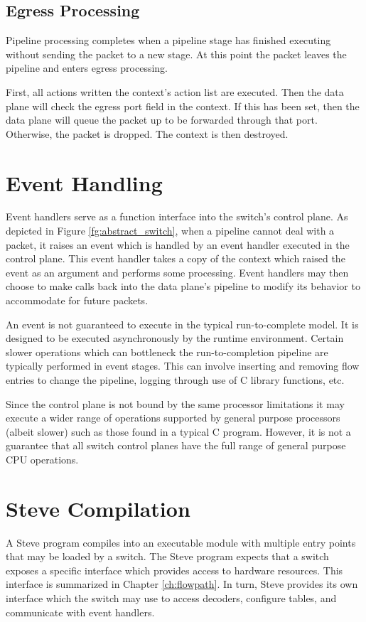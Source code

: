 \subsection{Egress Processing} \label{egress_desc}

Pipeline processing completes when a pipeline stage has finished executing
without sending the packet to a new stage. At this point the packet leaves the
pipeline and enters egress processing.

First, all actions written the context's action list are executed. Then the data
plane will check the egress port field in the context. If this has been set,
then the data plane will queue the packet up to be forwarded through that port.
Otherwise, the packet is dropped. The context is then destroyed.

\section{Event Handling} \label{events_desc}

Event handlers serve as a function interface into the switch's control plane.
As depicted in Figure \ref{fg:abstract_switch}, when a pipeline
cannot deal with a packet, it raises an event which is 
handled by an event handler executed in the control plane.
This event handler takes a copy of the context which raised the
event as an argument and performs some processing.
Event handlers may then choose to make calls back into the data plane's
pipeline to modify its behavior to accommodate for future packets.

An event is not guaranteed to execute in the typical run-to-complete model.
It is designed to be executed asynchronously by the runtime environment.
Certain slower operations which can
bottleneck the run-to-completion pipeline are typically performed in event
stages. This can involve inserting and removing flow entries to change the
pipeline, logging through use of C library functions, etc.

Since the control plane is not bound by the same processor limitations
it may execute a wider range of operations supported by general purpose processors (albeit slower) such as those found in a typical C program. However, it is not a guarantee that all switch control planes have the full range of general purpose CPU operations.

\section{Steve Compilation} \label{compile_desc}

A Steve program compiles into an executable module with multiple entry points
that may be loaded by a switch. The Steve program expects that a switch exposes a specific interface which provides access to hardware resources. This interface is summarized in Chapter \ref{ch:flowpath}. In turn, Steve provides its own interface which the switch may use to access decoders, configure tables, and communicate with event handlers.